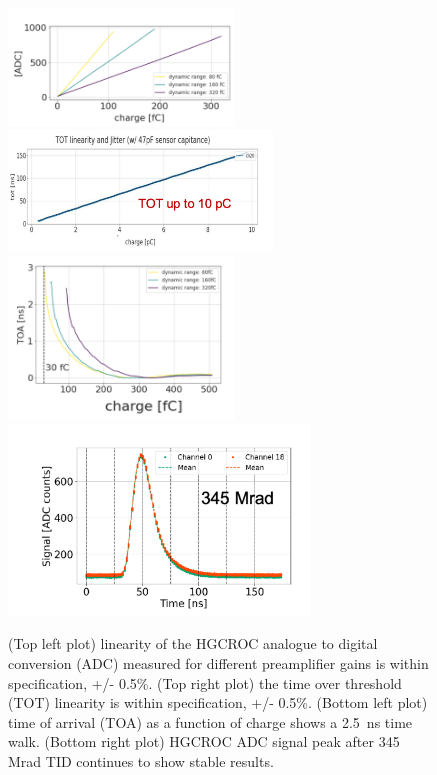 \documentclass[twocolumn]{webofc}
\begin{document}
\begin{figure}[ht]
\centering
\includegraphics[width=6cm]{figures/roc-ADClinearity.png}
\includegraphics[width=7cm]{figures/roc-TOTlinearity.png}\\
\includegraphics[width=6cm]{figures/roc-toaTimewalk.png}
\includegraphics[width=8cm]{figures/roc-ADCirradiation.png}
\caption{(Top left plot) linearity of the HGCROC analogue to digital conversion (ADC) measured for different preamplifier gains is within specification, +/- 0.5\%. (Top right plot) the time over threshold (TOT) linearity is within specification, +/- 0.5\%. (Bottom left plot) time of arrival (TOA) as a function of charge shows a 2.5~ns time walk. (Bottom right plot) HGCROC ADC signal peak after 345 Mrad TID continues to show stable results.}
\label{fig:roc}
\vspace*{-0.6cm}
\end{figure}
\end{document}
